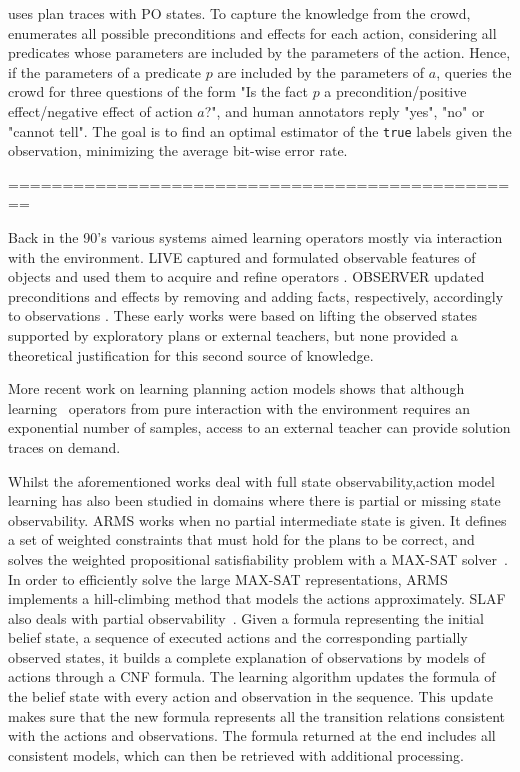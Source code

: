 \CAMA uses plan traces with PO states. To capture the knowledge from the crowd, \CAMA enumerates all possible preconditions and effects for each action, considering all predicates whose parameters are included by the parameters of the action. Hence, if the parameters of a predicate $p$ are included by the parameters of $a$, \CAMA queries the crowd for three questions of the form "Is the fact $p$ a precondition/positive effect/negative effect of action $a$?", and human annotators reply "yes", "no" or "cannot tell". The goal is to find an optimal estimator of the \texttt{true} labels given the observation, minimizing the average bit-wise error rate.





================================================

Back in the 90's various systems aimed learning operators mostly via interaction with the environment. {\sc LIVE} captured and formulated observable features of objects and used them to acquire and refine operators \cite{ShenS89}. {\sc OBSERVER} updated preconditions and effects by removing and adding facts, respectively, accordingly to observations \cite{Wang95learningby}. These early works were based on lifting the observed states supported by exploratory plans or external teachers, but none provided a theoretical justification for this second source of knowledge.

More recent work on learning planning action models \cite{WalshL08} shows that although learning \strips\ operators from pure interaction with the environment requires an exponential number of samples, access to an external teacher can provide solution traces on demand.

Whilst the aforementioned works deal with full state observability,action model learning has also been studied in domains where there is partial or missing state observability. {\sf ARMS} works when no partial intermediate state is given. It defines a set of weighted constraints that must hold for the plans to be correct, and solves the weighted propositional satisfiability problem with a MAX-SAT solver~\cite{yang2007learning}. In order to efficiently solve the large MAX-SAT representations, {\sf ARMS} implements a hill-climbing method that models the actions approximately. %
{\sc SLAF} also deals with partial observability~\cite{amir:alearning:JAIR08}. Given a formula representing the initial belief state, a sequence of executed actions and the corresponding partially observed states, it builds a complete explanation of observations by models of actions through a CNF formula. The learning algorithm updates the formula of the belief state with every action and observation in the sequence. This update makes sure that the new formula represents all the transition relations consistent with the actions and observations. The formula returned at the end includes all consistent models, which can then be retrieved with additional processing.

